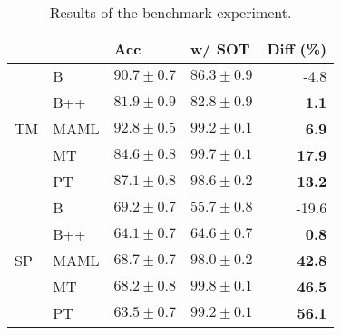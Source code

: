 \begin{table}[h]
\caption{Results of the benchmark experiment.}
\label{tab:tuned-benchmark}
\centering
\begin{tabular}{llllr}
\toprule
 &  & Acc & w/ SOT & Diff (\%) \\
\midrule
\multirow[c]{5}{*}{TM} & B & $90.7 \pm 0.7$ & $86.3 \pm 0.9$ & -4.8 \\
 & B++ & $81.9 \pm 0.9$ & $82.8 \pm 0.9$ & \bfseries 1.1 \\
 & MAML & $92.8 \pm 0.5$ & $99.2 \pm 0.1$ & \bfseries 6.9 \\
 & MT & $84.6 \pm 0.8$ & $99.7 \pm 0.1$ & \bfseries 17.9 \\
 & PT & $87.1 \pm 0.8$ & $98.6 \pm 0.2$ & \bfseries 13.2 \\
\midrule
\multirow[c]{5}{*}{SP} & B & $69.2 \pm 0.7$ & $55.7 \pm 0.8$ & -19.6 \\
 & B++ & $64.1 \pm 0.7$ & $64.6 \pm 0.7$ & \bfseries 0.8 \\
 & MAML & $68.7 \pm 0.7$ & $98.0 \pm 0.2$ & \bfseries 42.8 \\
 & MT & $68.2 \pm 0.8$ & $99.8 \pm 0.1$ & \bfseries 46.5 \\
 & PT & $63.5 \pm 0.7$ & $99.2 \pm 0.1$ & \bfseries 56.1 \\
\bottomrule
\end{tabular}
\end{table}